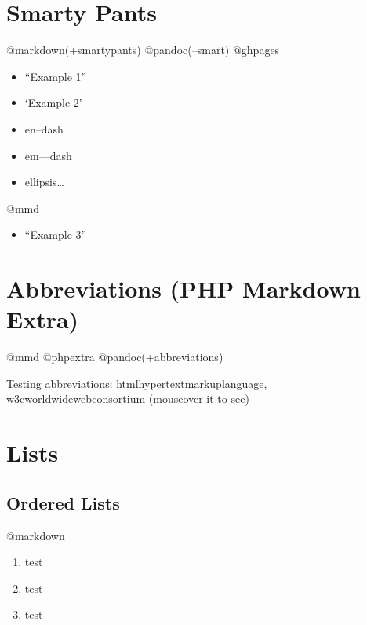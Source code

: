 \section{Smarty Pants}
\label{smartypants}

@markdown(+smartypants) @pandoc(--smart) @ghpages

\begin{itemize}
\item ``Example 1''

\item `Example 2'

\item en--dash

\item em---dash

\item ellipsis{\ldots}

\end{itemize}

@mmd

\begin{itemize}
\item ``Example 3''

\end{itemize}

\section{Abbreviations (PHP Markdown Extra)}
\label{abbreviationsphpmarkdownextra}

@mmd @phpextra @pandoc(+abbreviations)

Testing abbreviations: \ac{htmlhypertextmarkuplanguage}, \ac{w3cworldwidewebconsortium} (mouseover it to see)

\section{Lists}
\label{lists}

\subsection{Ordered Lists}
\label{orderedlists}

@markdown

\begin{enumerate}
\item test

\item test

\item test

\end{enumerate}

